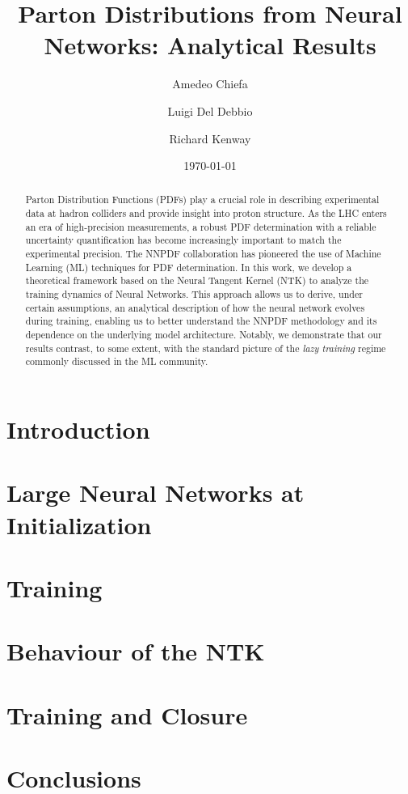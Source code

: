 \documentclass[11pt]{article}
\title{Parton Distributions from Neural Networks: Analytical Results}
\author{Amedeo Chiefa}
\author{Luigi Del Debbio}
\author{Richard Kenway}
\affil{Higgs Centre for Theoretical Physics, School of Physics and Astronomy,
Peter~Guthrie~Tait~Road, Edinburgh EH9 3FD, United Kingdom.}
\date{\today}
\begin{document}
\maketitle

\begin{abstract}
  Parton Distribution Functions (PDFs) play a crucial role in describing
  experimental data at hadron colliders and provide insight into proton
  structure. As the LHC enters an era of high-precision measurements, a robust
  PDF determination with a reliable uncertainty quantification has become
  increasingly important to match the experimental precision. The NNPDF
  collaboration has pioneered the use of Machine Learning (ML) techniques for PDF
  determination. In this work, we develop a theoretical framework based on the
  Neural Tangent Kernel (NTK) to analyze the training dynamics of Neural
  Networks. This approach allows us to derive, under certain assumptions, an
  analytical description of how the neural network evolves during training,
  enabling us to better understand the NNPDF methodology and its dependence on
  the underlying model architecture. Notably, we demonstrate that our results
  contrast, to some extent, with the standard picture of the \textit{lazy training}
  regime commonly discussed in the ML community.
\end{abstract}

\section{Introduction}
\label{sec:intro}



\section{Large Neural Networks at Initialization}
\label{sec:Init}



\section{Training}
\label{sec:Training}



\section{Behaviour of the NTK}
\label{sec:NTKPheno}



\section{Training and Closure}
\label{sec:TrainClosure}



\section{Conclusions}
\label{sec:Conclusions}


\newpage




\appendix

\end{document}

